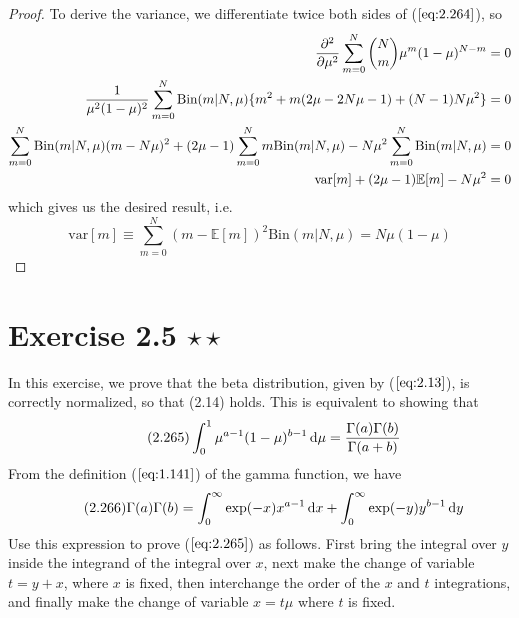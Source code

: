 \begin{proof}
    To derive the variance, we differentiate twice both sides
    of ($\ref{eq:2.264}$), so
    \begin{align*}
        \pdv[2]{\mu} \sum_{m=0}^{N} \binom{N}{m} \mu^m(1 - \mu)^{N - m} &= 0 \\
        \frac{1}{\mu^2(1 - \mu)^2} \sum_{m=0}^{N} \text{Bin}(m | N, \mu) 
            \{m^2 + m(2\mu - 2N\mu - 1) + (N - 1)N\mu^2\} &=0 \\
        \sum_{m=0}^{N} \text{Bin}(m | N, \mu) (m - N\mu)^2
            + (2\mu - 1)\sum_{m=0}^{N} m\text{Bin}(m | N, \mu)
            - N\mu^2 \sum_{m=0}^{N} \text{Bin}(m | N, \mu) &= 0 \\
        \text{var}[m] + (2\mu - 1)\mathbb{E}[m] - N\mu^2 &= 0
    \end{align*}
    which gives us the desired result, i.e.
    \begin{equation}\label{eq:2.12}\tag{2.12}
        \text{var}[m] \equiv \sum_{m=0}^{N} (m - \mathbb{E}[m])^2 \text{Bin}(m | N, \mu) = N\mu(1 - \mu)
    \end{equation}
\end{proof}

\section*{Exercise 2.5 $\star \star$}
In this exercise, we prove that the beta distribution, given by
($\ref{eq:2.13}$), is correctly normalized, so that (2.14) holds.
This is equivalent to showing that
\begin{equation}\label{eq:2.265}\tag{2.265}
    \int_{0}^{1} \mu^{a-1}(1 - \mu)^{b - 1} \mathop{}\!\mathrm{d} \mu = \frac{\Gamma(a)\Gamma(b)}{\Gamma(a+b)}
\end{equation}
From the definition ($\ref{eq:1.141}$) of the gamma function,
we have 
\begin{equation}\label{eq:2.266}\tag{2.266}
    \Gamma(a)\Gamma(b) = \int_{0}^{\infty} \exp(-x)x^{a - 1} \mathop{}\!\mathrm{d} x +
    \int_{0}^{\infty} \exp(-y)y^{b - 1} \mathop{}\!\mathrm{d} y
\end{equation}
Use this expression to prove ($\ref{eq:2.265}$) as follows. First
bring the integral over $y$ inside the integrand of the integral 
over $x$, next make the change of variable $t = y + x$, where $x$
is fixed, then interchange the order of the $x$ and $t$ integrations,
and finally make the change of variable $x = t\mu$ where $t$ is fixed. 

\vspace{1em}


